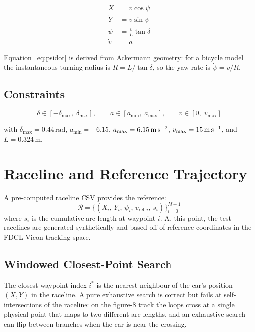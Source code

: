 \documentclass[11pt]{article}
\begin{document}
\begin{align}
\dot{X}   &= v \cos\psi \label{eq:xdot}\\
\dot{Y}   &= v \sin\psi \label{eq:ydot}\\
\dot{\psi} &= \frac{v}{L}\tan\delta \label{eq:psidot}\\
\dot{v}   &= a \label{eq:vdot}
\end{align}

Equation~\eqref{eq:psidot} is derived from Ackermann geometry: for a bicycle
model the instantaneous turning radius is $R = L / \tan\delta$, so the yaw rate
is $\dot{\psi} = v/R$.

\subsection{Constraints}

\[
\delta \in [-\delta_{\max},\; \delta_{\max}], \qquad
a     \in [a_{\min},\; a_{\max}], \qquad
v     \in [0,\; v_{\max}]
\]

with $\delta_{\max} = 0.44\,\text{rad}$, $a_{\min} = -6.15$, $a_{\max} = 6.15\,\text{m\,s}^{-2}$,
$v_{\max} = 15\,\text{m\,s}^{-1}$, and $L = 0.324\,\text{m}$.


\section{Raceline and Reference Trajectory}

A pre-computed raceline CSV provides the reference:
\[
\mathcal{R} = \{(X_i,\, Y_i,\, \psi_i,\, v_{\text{ref},i},\, s_i)\}_{i=0}^{M-1}
\]
where $s_i$ is the cumulative arc length at waypoint $i$.
At this point, the test racelines are generated synthetically and based off of reference coordinates in the FDCL Vicon tracking space.

\subsection{Windowed Closest-Point Search}

The closest waypoint index $i^*$ is the nearest neighbour of the car's
position $(X, Y)$ in the raceline.  A pure exhaustive search is correct but
fails at self-intersections of the raceline: on the figure-8 track the
loops cross at a single physical point that maps to two different arc lengths,
and an exhaustive search can flip between branches when the car is near the
crossing.
\end{document}
